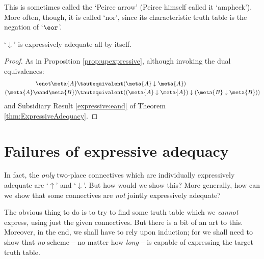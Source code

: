 This is sometimes called the `Peirce arrow' (Peirce himself called it `ampheck'). More often, though, it is called `nor', since its characteristic truth table is the negation of `$\eor$'.
	\begin{prop}\label{prop:downexpressive}
	`$\downarrow$' is expressively adequate all by itself. 
	\begin{proof}
	As in Proposition \ref{prop:upexpressive}, although invoking the dual equivalences:
		\begin{align*}
			\enot \meta{A} &\tautequivalent (\meta{A} \downarrow \meta{A})\\
			(\meta{A} \eand \meta{B}) & \tautequivalent ((\meta{A} \downarrow \meta{A}) \downarrow (\meta{B} \downarrow \meta{B}))
		\end{align*}
		and Subsidiary Result \ref{expressive:eand} of Theorem \ref{thm:ExpressiveAdequacy}.
	\end{proof}
\end{prop}

\section{Failures of expressive adequacy}
 In fact, the \emph{only} two-place connectives which are individually expressively adequate are `$\uparrow$' and `$\downarrow$'. But how would we show this? More generally, how can we show that some connectives are \emph{not} jointly expressively adequate? 
 
The obvious thing to do is to try to find some truth table which we \emph{cannot} express, using just the given connectives. But there is a bit of an art to this. Moreover, in the end, we shall have to rely upon induction; for we shall need to show that \emph{no} scheme -- no matter how \emph{long} -- is capable of expressing the target truth table. 
 
